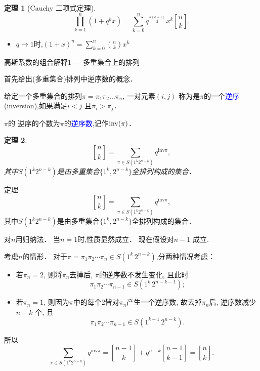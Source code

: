\documentclass[punct]{ctexbeamer}
\newtheorem{thm}{定理}[section]
\newcommand{\blue}{\textcolor{blue}}
\def\pf{\noindent {\bf 证明\ }}
\begin{document}
\begin{frame}
\begin{thm}[Cauchy 二项式定理]
	\label{coro-cauchy binomial}
	\begin{equation*}
		\prod_{k=1}^{n}(1+ q^k  x)=\sum_{k=0}^{n} q^{\frac{k(k+1)}{2}} x^k   {n \brack k}.
	\end{equation*}
\end{thm}
\begin{itemize}
	\item $q \rightarrow 1$时,$(1+x)^n=\sum_{k=0}^{n}\binom{n}{k}x^k $
\end{itemize}

\end{frame}



\begin{frame}{高斯系数的组合解释1 --- 多重集合上的排列}

    首先给出(多重集合)排列中逆序数的概念．

    给定一个多重集合的排列$\pi=\pi_1 \pi_2 \dots \pi_n$, 一对元素$(i,j)$ 称为是$\pi$的一个\blue{逆序}(inversion),如果满足$i<j$ 且$\pi_i>\pi_j$．

    $\pi$的
    逆序的个数为$\pi$的\blue{逆序数},记作${\rm inv}(\pi)$．

    \begin{thm}
        $${n\brack k}=\sum_{\pi\in S(1^k2^{n-k})}q^{\mathrm{inv} \pi},$$
        其中$S(1^k2^{n-k})$是由多重集合$\{1^k, 2^{n-k}\}$全排列构成的集合．
    \end{thm}



\end{frame}

\begin{frame}

    \begin{block}{定理}
        $${n\brack k}=\sum_{\pi\in S(1^k2^{n-k})}q^{\mathrm{inv} \pi},$$
        其中$S(1^k2^{n-k})$是由多重集合$\{1^k, 2^{n-k}\}$全排列构成的集合．
    \end{block}

    \pf
    对$n$用归纳法．
    当$n=1$时,性质显然成立． 现在假设对$n-1$ 成立.


    考虑$n$的情形．
    对于$\pi=\pi_1 \pi_2 \cdots \pi_n\in S(1^k\, 2^{n-k})$,分两种情况考虑：

    \begin{itemize}
        \item     若$\pi_n=2$,
        则将$\pi_n$去掉后, $\pi$的逆序数不发生变化, 且此时$$\pi_1 \pi_2\cdots
        \pi_{n-1}\in S(1^k\, 2^{n-k-1});$$
        \item
        若$\pi_n=1$,
        则因为$\pi$中的每个$2$皆对$\pi_n$产生一个逆序数, 故去掉$\pi_n$后, 逆序数减少$n-k$ 个, 且$$\pi_1 \pi_2\cdots  \pi_{n-1}\in S(1^{k-1}\, 2^{n-k}).$$
    \end{itemize}


    所以
    $$ \sum_{\pi\in
        S(1^k2^{n-k})}q^{\mathrm{inv} \pi}={n-1\brack
        k}+q^{n-k}{n-1\brack{k-1}}={n\brack k}.$$
\end{frame}
\end{document}
